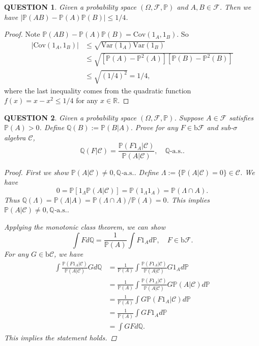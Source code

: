 \documentclass[12pt]{article}
\renewcommand{\(}{\left(}%
\renewcommand{\)}{\right)}%
\renewcommand{\[}{\left[}%
\renewcommand{\]}{\right]}%
\renewcommand{\r}{\mathbb{R}}
\renewcommand{\ae}{\mathrm{a.s.}}
\newcommand{\p}{\mathbb{P}}
\newcommand{\q}{\mathbb{Q}}
\newcommand{\f}{\mathscr{F}}
\newtheorem{question}{QUESTION}[section]}
\newtheorem{proof}{Proof.}}
\begin{document}
  \begin{question}
  	Given a probability space $(\Omega,\f,\p)$ and $A,B\in\f$. Then we have $|\p(AB)-\p(A)\p(B)|\leq 1/4$.
  \end{question}
  \begin{proof}
  	Note $\p(AB)-\p(A)\p(B)=\mathrm{Cov}(1_A,1_B)$. So
  	\begin{equation*}
  		\begin{split}
  			|\mathrm{Cov}(1_A,1_B)|&\leq \sqrt{\mathrm{Var}(1_A)\mathrm{Var}(1_B)}\\
  			&\leq \sqrt{\[\p(A)-\p^2(A)\]\[\p(B)-\p^2(B)\]}\\
  			&\leq \sqrt{(1/4)^2}=1/4,
  		\end{split}
  	\end{equation*}
  	where the last inequality comes from the quadratic function $f(x)=x-x^2\leq 1/4$ for any $x\in\r$.
  \end{proof}
  
  \begin{question}
  	Given a probability space $(\Omega,\f,\p)$. Suppose $A\in\f$ satisfies $\p(A)>0$. Define $\q(B):=\p(B|A)$. Prove for any $F\in\mathrm{b}\f$ and sub-$\sigma$ algebra $\mathscr{C}$,
  	\begin{equation*}
  		\q(F|\mathscr{C})=\frac{\p(F1_A|\mathscr{C})}{\p(A|\mathscr{C})},\quad \q\text{-}\ae.
  	\end{equation*}
  	\begin{proof}
  		First we show $\p(A|\mathscr{C})\neq 0,\q$-$\ae$. Define $\Lambda:=\{\p(A|\mathscr{C})=0\}\in \mathscr{C}$. We have
  		\begin{equation*}
  			0=\p[1_\Lambda \p(A|\mathscr{C})]=\p(1_\Lambda 1_A )=\p(\Lambda\cap A).
  		\end{equation*}
  		Thus $\q(\Lambda)=\p(\Lambda|A)=\p(\Lambda\cap A)/\p(A)=0$. This implies $\p(A|\mathscr{C})\neq 0,\q$-$\ae$.
  		
  		Applying the monotonic class theorem, we can show 
  		\begin{equation*}
  			\int Fd\q=\frac{1}{\p(A)}\int F1_Ad\p,\quad F\in \mathrm{b}\f.
  		\end{equation*}
  		For any $G\in\mathrm{b}\mathscr{C}$, we have
  		\begin{equation*}
  			\begin{split}
  				\int \frac{\p(F1_A|\mathscr{C})}{\p(A|\mathscr{C})} Gd\q&=\frac{1}{\p(A)}\int \frac{\p(F1_A|\mathscr{C})}{\p(A|\mathscr{C})} G1_Ad\p\\
  				&=\frac{1}{\p(A)}\int \frac{\p(F1_A|\mathscr{C})}{\p(A|\mathscr{C})} G\p(A|\mathscr{C})d\p\\
  				&=\frac{1}{\p(A)}\int G\p(F1_A|\mathscr{C})d\p\\
  				&=\frac{1}{\p(A)}\int GF1_Ad\p\\
  				&=\int GFd\q.
  			\end{split}
  		\end{equation*}
  		This implies the statement holds.
  	\end{proof}
  \end{question}
  
\end{document}
